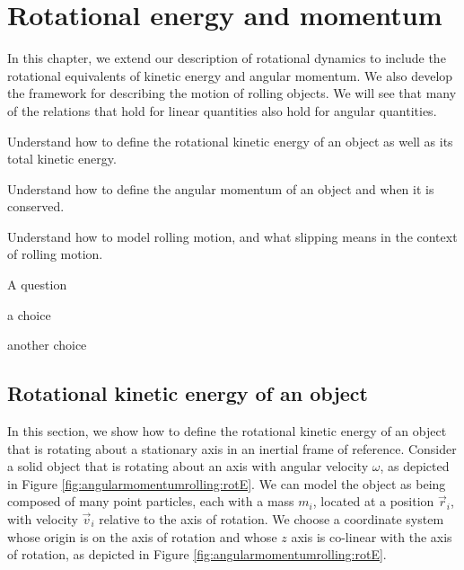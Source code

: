 
\chapter{Rotational energy and momentum}
\label{chapter:angularmomentumrolling}
In this chapter, we extend our description of rotational dynamics to include the rotational equivalents of kinetic energy and angular momentum. We also develop the framework for describing the motion of rolling objects. We will see that many of the relations that hold for linear quantities also hold for angular quantities. 

\begin{learningObjectives}{
 \item Understand how to define the rotational kinetic energy of an object as well as its total kinetic energy.
 \item Understand how to define the angular momentum of an object and when it is conserved.
 \item Understand how to model rolling motion, and what slipping means in the context of rolling motion.
 }
\end{learningObjectives}

\begin{opening}
\begin{MCquestion}{A question}
\item a choice
\item another choice %
\end{MCquestion}
\end{opening}

\section{Rotational kinetic energy of an object}
In this section, we show how to define the rotational kinetic energy of an object that is rotating about a stationary axis in an inertial frame of reference. Consider a solid object that is rotating about an axis with angular velocity $\omega$, as depicted in Figure \ref{fig:angularmomentumrolling:rotE}.
We can model the object as being composed of many point particles, each with a mass $m_i$, located at a position $\vec r_i$, with velocity $\vec v_i$ relative to the axis of rotation. We choose a coordinate system whose origin is on the axis of rotation and whose $z$ axis is co-linear with the axis of rotation, as depicted in Figure \ref{fig:angularmomentumrolling:rotE}.

